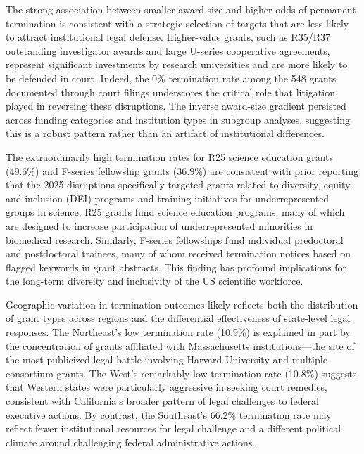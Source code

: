 \documentclass[10pt, letterpaper]{article}
\begin{document}
The strong association between smaller award size and higher odds of permanent termination is consistent with a strategic selection of targets that are less likely to attract institutional legal defense. Higher-value grants, such as R35/R37 outstanding investigator awards and large U-series cooperative agreements, represent significant investments by research universities and are more likely to be defended in court. Indeed, the 0\% termination rate among the 548 grants documented through court filings underscores the critical role that litigation played in reversing these disruptions.\cite{aaas2025court,sciencemag2025court} The inverse award-size gradient persisted across funding categories and institution types in subgroup analyses, suggesting this is a robust pattern rather than an artifact of institutional differences.

The extraordinarily high termination rates for R25 science education grants (49.6\%) and F-series fellowship grants (36.9\%) are consistent with prior reporting that the 2025 disruptions specifically targeted grants related to diversity, equity, and inclusion (DEI) programs and training initiatives for underrepresented groups in science.\cite{sciencemag2025dei,nature2025cuts} R25 grants fund science education programs, many of which are designed to increase participation of underrepresented minorities in biomedical research.\cite{nih2025r25} Similarly, F-series fellowships fund individual predoctoral and postdoctoral trainees, many of whom received termination notices based on flagged keywords in grant abstracts. This finding has profound implications for the long-term diversity and inclusivity of the US scientific workforce.\cite{teitelbaum2024diversity,watkins2019minority}

Geographic variation in termination outcomes likely reflects both the distribution of grant types across regions and the differential effectiveness of state-level legal responses. The Northeast's low termination rate (10.9\%) is explained in part by the concentration of grants affiliated with Massachusetts institutions---the site of the most publicized legal battle involving Harvard University and multiple consortium grants.\cite{harvardgazette2025funding} The West's remarkably low termination rate (10.8\%) suggests that Western states were particularly aggressive in seeking court remedies, consistent with California's broader pattern of legal challenges to federal executive actions.\cite{california2025legal} By contrast, the Southeast's 66.2\% termination rate may reflect fewer institutional resources for legal challenge and a different political climate around challenging federal administrative actions.\cite{blume2018funding}
\end{document}

